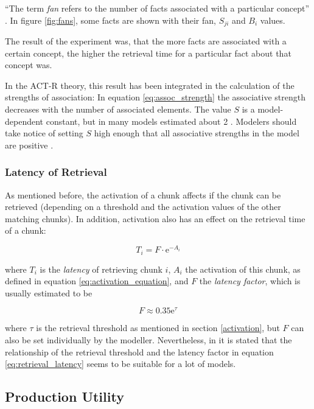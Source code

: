 ``The term \emph{fan} refers to the number of facts associated with a particular concept'' \cite[186]{anderson_fan_1999}. In figure \ref{fig:fans}, some facts are shown with their fan, $S_{ji}$ and $B_i$ values.

The result of the experiment was, that the more facts are associated with a certain concept, the higher the retrieval time for a particular fact about that concept was.

In the ACT-R theory, this result has been integrated in the calculation of the strengths of association: In equation \eqref{eq:assoc_strength} the associative strength decreases with the number of associated elements. The value $S$ is a model-dependent constant, but in many models estimated about 2 \cite[1042]{anderson_integrated_2004}. Modelers should take notice of setting $S$ high enough that all associative strengths in the model are positive \cite[unit 5, p. 3]{actr_tutorial}.

\subsubsection{Latency of Retrieval}

As mentioned before, the activation of a chunk affects if the chunk can be retrieved (depending on a threshold and the activation values of the other matching chunks). In addition, activation also has an effect on the retrieval time of a chunk:

\begin{equation}
\label{eq:retrieval_latency}
T_i = F \cdot \mathrm{e}^{-A_i}
\end{equation}

where $T_i$ is the \emph{latency} of retrieving chunk $i$, $A_i$ the activation of this chunk, as defined in equation \eqref{eq:activation_equation}, and $F$ the \emph{latency factor}, which is usually estimated to be

\begin{equation}
F \approx 0.35\mathrm{e}^\tau
\end{equation}

where $\tau$ is the retrieval threshold as mentioned in section \ref{activation}, but $F$ can also be set individually by the modeller. Nevertheless, in \cite[1042]{anderson_integrated_2004} it is stated that the relationship of the retrieval threshold and the latency factor in equation \eqref{eq:retrieval_latency} seems to be suitable for a lot of models.

\subsection{Production Utility}
\label{production_utility}

